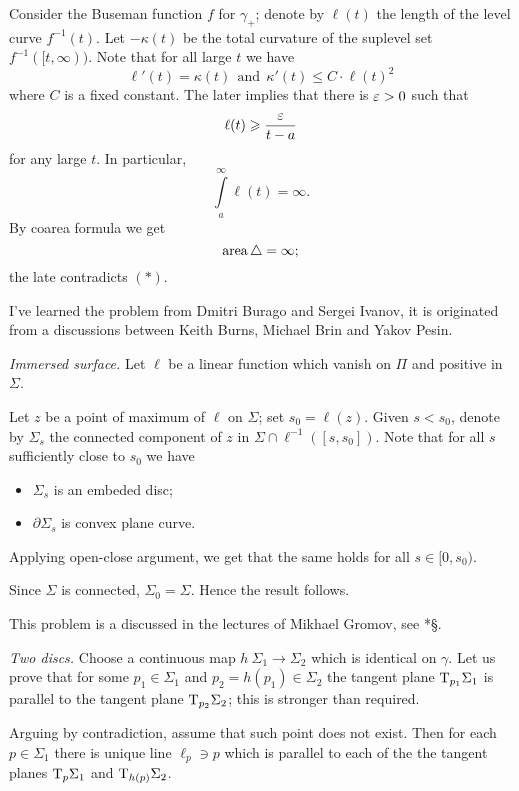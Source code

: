 Consider the Buseman function $f$ for $\gamma_+$;
denote by $\ell(t)$ the length of the level curve $f^{-1}(t)$.
Let $-\kappa(t)$  be the total curvature of the suplevel set $f^{-1}([t,\infty))$.  
Note that for all large $t$ we have
\[\ell'(t)=\kappa(t)
\ \ \text{and}\ \ 
\kappa'(t)\le C\cdot \ell(t)^2\] 
where $C$ is a fixed constant.
The later implies that there is $\varepsilon>0$ such that
\[\ell(t)\geqslant \frac{\varepsilon}{t-a}\]
for any large $t$.
In particular,
\[\int\limits_a^\infty\ell(t)=\infty.\]
By coarea formula we get 
\[\operatorname{\rm area}\triangle=\infty;\]
the late contradicts $(*)$.

I've learned the problem from Dmitri Burago and Sergei
Ivanov, it is originated from a discussions between
Keith Burns, Michael Brin and Yakov Pesin.
 


\textit{Immersed surface.}
Let $\ell$ be a linear function which vanish on $\Pi$ and positive in $\Sigma$.

Let $z$ be a point of maximum of $\ell$ on $\Sigma$;
set $s_0=\ell(z)$.
Given $s<s_0$, denote by $\Sigma_s$ the connected component of $z$ in $\Sigma\cap\ell^{-1}([s,s_0])$.
Note that for all $s$ sufficiently close to $s_0$
we have
\begin{itemize}
\item $\Sigma_s$ is an embeded disc;
\item $\partial\Sigma_s$ is convex plane curve.
\end{itemize}

Applying open-close argument, we get that the same holds for all $s\in[0,s_0)$.

Since $\Sigma$ is connected, $\Sigma_0=\Sigma$.
Hence the result follows.

This problem is a discussed in the lectures of Mikhael Gromov, 
see \cite{gromov-SGMC}*{\S\textonehalf}.



\textit{Two discs.}
Choose a continuous map $h\:\Sigma_1\to \Sigma_2$
which is identical on $\gamma$.
Let us prove that for some $p_1\in \Sigma_1$ and $p_2=h(p_1)\in \Sigma_2$
the tangent plane $\mathrm{T}_{p_1} \Sigma_1$ is parallel to the tangent plane $\mathrm{T}_{p_2} \Sigma_2$;
this is stronger than required.

Arguing by contradiction,
assume that such point does not exist.
Then for each $p\in\Sigma_1$
there is unique line $\ell_p\ni p$ 
which is parallel to each of the the tangent planes $\mathrm{T}_{p} \Sigma_1$ and $\mathrm{T}_{h(p)} \Sigma_2$.

